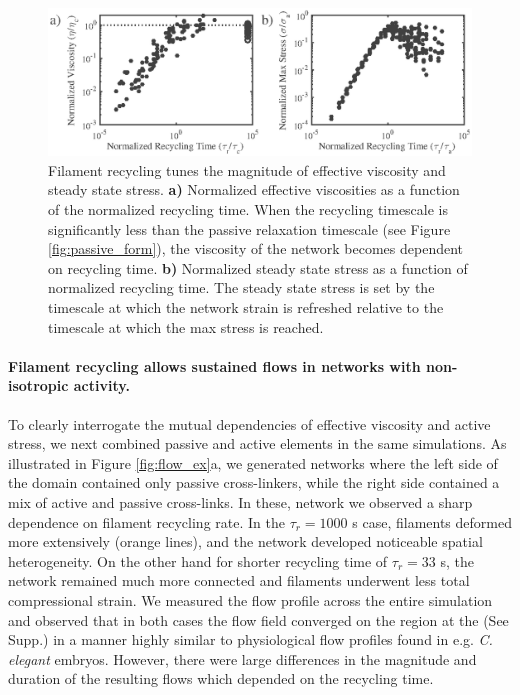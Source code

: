 \documentclass[10pt,letterpaper]{article}
\begin{document}
\begin{figure}[h!]
\centering
\includegraphics[width=\hsize]{figures/figure5S}
\caption{\label{fig:rec_form}  Filament recycling tunes the magnitude of effective viscosity and steady state stress. \textbf{a)}  Normalized effective viscosities as a function of the normalized recycling time. When the recycling timescale is significantly less than the passive relaxation timescale (see Figure \ref{fig:passive_form}), the viscosity of the network becomes dependent on recycling time.  \textbf{b)} Normalized steady state stress as a function of normalized recycling time.  The steady state stress is set by the timescale at which the network strain is refreshed relative to the timescale at which the max stress is reached. }
\end{figure}


\paragraph{Filament recycling allows sustained flows in networks with non-isotropic activity.}
To clearly interrogate the mutual dependencies of effective viscosity and active stress, we next combined passive and active elements in the same simulations.  As illustrated in Figure \ref{fig:flow_ex}a, we generated networks where the left side of the domain contained only passive cross-linkers, while the right side contained a mix of active and passive cross-links.  In these, network we observed a sharp dependence on filament recycling rate.  In the $\tau_r=1000$ s case, filaments deformed more extensively (orange lines), and the network developed noticeable spatial heterogeneity.  On the other hand for shorter recycling time of $\tau_r=33$ s, the network remained much more connected and filaments underwent less total compressional strain.  We measured the flow profile across the entire simulation and observed that in both cases the flow field converged on the region at the (See Supp.) in a manner highly similar to physiological flow profiles found in e.g. \textit{C. elegant} embryos.  However, there were large differences in the magnitude and duration of the resulting flows which depended on the recycling time.
\end{document}
